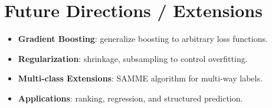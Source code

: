 \documentclass[11pt]{article}
\begin{document}
\section{Future Directions / Extensions}
\begin{itemize}
  \item \textbf{Gradient Boosting}: generalize boosting to arbitrary loss functions.
  \item \textbf{Regularization}: shrinkage, subsampling to control overfitting.
  \item \textbf{Multi-class Extensions}: SAMME algorithm for multi-way labels.
  \item \textbf{Applications}: ranking, regression, and structured prediction.
\end{itemize}
\end{document}
